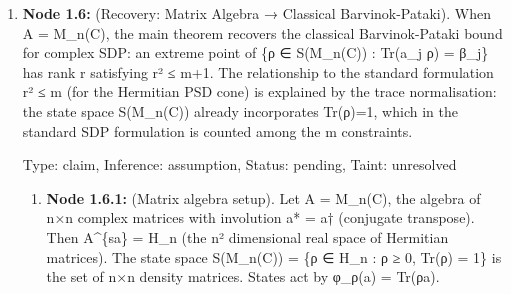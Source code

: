\documentclass{article}
\begin{document}
\begin{enumerate}
\begin{enumerate}
Step 3 (GNS decomposition and multiplicity bound): By Node 1.5.3, part (II), the GNS representation is pi\_mu = direct\_sum\_\{j=1\}\textasciicircum{}k ev\_\{x\_j\} with each multiplicity n\_j = 1 (as established in Node 1.5.2). By Node 1.4 (commutant decomposition), dim\_R(pi\_mu(C(X))'\textasciicircum{}\{sa\}) = sum\_\{j=1\}\textasciicircum{}k n\_j\textasciicircum{}2 = k * 1 = k. Combining with the main bound: k <= m + 1.

Conclusion: Every extreme point of the constrained set of probability measures \{mu in M\_1\textasciicircum{}+(X) : integral f\_j d mu = beta\_j, j = 1,...,m\} is a discrete (atomic) measure supported on at most m + 1 points. This is the Richter-Rogosinski theorem (Richter 1957, Rogosinski 1958), also known as the measure-theoretic form of Caratheodory's theorem for moment problems. Note that the logical flow is: main bound => finite commutant => finite support (via L\textasciicircum{}infty characterisation) => k <= m+1. The finite support is CONCLUDED (not assumed), resolving the circularity concern.

This is an application of the main theorem (Nodes 1.3, 1.4) to the abelian specialisation (Nodes 1.5.1, 1.5.2, 1.5.3). It is a deduction, not an assumption. Dependencies: Nodes 1.3, 1.4, 1.5.1, 1.5.2, 1.5.3.

  Type: claim, Inference: assumption, Status: pending, Taint: unresolved

\end{enumerate}
\item \textbf{Node 1.6:} (Recovery: Matrix Algebra → Classical Barvinok-Pataki). When A = M\_n(C), the main theorem recovers the classical Barvinok-Pataki bound for complex SDP: an extreme point of \{ρ ∈ S(M\_n(C)) : Tr(a\_j ρ) = β\_j\} has rank r satisfying r² ≤ m+1. The relationship to the standard formulation r² ≤ m (for the Hermitian PSD cone) is explained by the trace normalisation: the state space S(M\_n(C)) already incorporates Tr(ρ)=1, which in the standard SDP formulation is counted among the m constraints.

  Type: claim, Inference: assumption, Status: pending, Taint: unresolved

\begin{enumerate}
\item \textbf{Node 1.6.1:} (Matrix algebra setup). Let A = M\_n(C), the algebra of n×n complex matrices with involution a* = a† (conjugate transpose). Then A\textasciicircum{}\{sa\} = H\_n (the n² dimensional real space of Hermitian matrices). The state space S(M\_n(C)) = \{ρ ∈ H\_n : ρ ≥ 0, Tr(ρ) = 1\} is the set of n×n density matrices. States act by φ\_ρ(a) = Tr(ρa).


\end{enumerate}
\end{enumerate}
\end{document}
